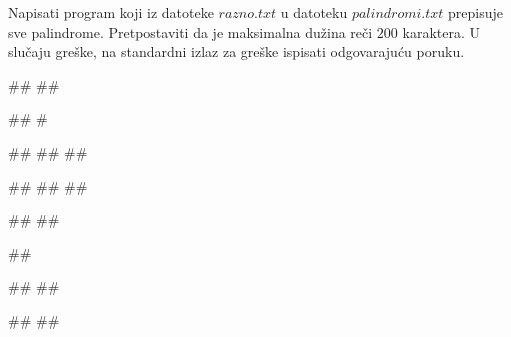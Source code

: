 \begin{Exercise}[label=p3_id20]         
Napisati program koji iz datoteke $razno.txt$ u datoteku $palindromi.txt$ prepisuje sve palindrome.  
Pretpostaviti da je maksimalna dužina reči $200$ karaktera.
U slučaju greške, na standardni izlaz za greške ispisati odgovarajuću poruku.

\begin{miditest}
\begin{upotreba}{1}
##
##

##
#
\end{upotreba}
\end{miditest}
\begin{miditest}
\begin{upotreba}{2}
##
##
##

##
##
##
\end{upotreba}
\end{miditest}

\begin{miditest}
\begin{upotreba}{3}
##
##

##
\end{upotreba}
\end{miditest}
\begin{miditest}
\begin{upotreba}{4}
##
##

##
##
\end{upotreba}
\end{miditest}
\end{Exercise}
\begin{Answer}[ref=p3_id20]
\end{Answer}


